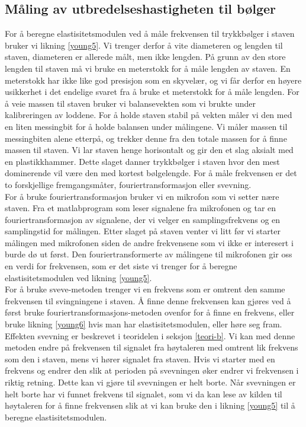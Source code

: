 \documentclass[%
 reprint,
 amsmath,amssymb,
 aps,
 norsk,
 booktabs
]{revtex4-1}
\begin{document}
\subsection{Måling av utbredelseshastigheten til bølger}
For å beregne elastisitetsmodulen ved å måle frekvensen til trykkbølger i staven bruker vi likning \eqref{young5}. Vi trenger derfor å vite diameteren og lengden til staven, diameteren er allerede målt, men ikke lengden. På grunn av den store lengden til staven må vi bruke en meterstokk for å måle lengden av staven. En meterstokk har ikke like god presisjon som en skyvelær, og vi får derfor en høyere usikkerhet i det endelige svaret fra å bruke et meterstokk for å måle lengden. For å veie massen til staven bruker vi balansevekten som vi brukte under kalibreringen av loddene. For å holde staven stabil på vekten måler vi den med en liten messingbit for å holde balansen under målingene. Vi måler massen til messingbiten alene etterpå, og trekker denne fra den totale massen for å finne massen til staven. Vi lar staven henge horisontalt og gir den et slag aksialt med en plastikkhammer. Dette slaget danner trykkbølger i staven hvor den mest dominerende vil være den med kortest bølgelengde. For å måle frekvensen er det to forskjellige fremgangsmåter, fouriertransformasjon eller svevning.\\
For å bruke fouriertransformasjon bruker vi en mikrofon som vi setter nære staven. Fra et matlabprogram som leser signalene fra mikrofonen og tar en fouriertransformasjon av signalene, der vi velger en samplingsfrekvens og en samplingstid for målingen. Etter slaget på staven venter vi litt før vi starter målingen med mikrofonen siden de andre frekvensene som vi ikke er interesert i burde dø ut først. Den fouriertransformerte av målingene til mikrofonen gir oss en verdi for frekvensen, som er det siste vi trenger for å beregne elastisitetsmodulen ved likning \eqref{young5}.\\
For å bruke sveve-metoden trenger vi en frekvens som er omtrent den samme frekvensen til svingningene i staven. Å finne denne frekvensen kan gjøres ved å først bruke fouriertransformasjons-metoden ovenfor for å finne en frekvens, eller bruke likning \eqref{young6} hvis man har elastisitetsmodulen, eller høre seg fram. Effekten svevning er beskrevet i teoridelen i seksjon \vref{teori-b}. Vi kan med denne metoden endre på frekvensen til signalet fra høytaleren med omtrent lik frekvens som den i staven, mens vi hører signalet fra staven. Hvis vi starter med en frekvens og endrer den slik at perioden på svevningen øker endrer vi frekvensen i riktig retning. Dette kan vi gjøre til svevningen er helt borte. Når svevningen er helt borte har vi funnet frekvens til signalet, som vi da kan lese av kilden til høytaleren for å finne frekvensen slik at vi kan bruke den i likning \eqref{young5} til å beregne elastisitetsmodulen.
\end{document}
